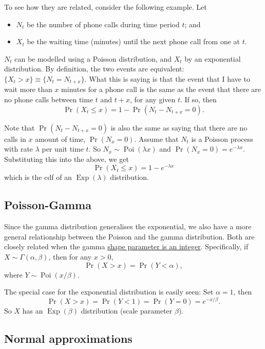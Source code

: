 \documentclass[
]{book}
\providecommand{\tightlist}{%
  \setlength{\itemsep}{0pt}\setlength{\parskip}{0pt}}
\DeclareMathOperator{\Pois}{Poi}
\DeclareMathOperator{\Exp}{Exp}
\theoremstyle{definition}
\theoremstyle{definition}
\theoremstyle{definition}
\theoremstyle{definition}
\theoremstyle{remark}
\begin{document}
To see how they are related, consider the following example.
Let

\begin{itemize}
\tightlist
\item
  \(N_t\) be the number of phone calls during time period \(t\); and
\item
  \(X_t\) be the waiting time (minutes) until the next phone call from one at \(t\).
\end{itemize}

\(N_t\) can be modelled using a Poisson distribution, and \(X_t\) by an exponential distribution.
By definition, the two events are equivalent: \(\{X_t > x \} \equiv \{N_t = N_{t+x}\}\).
What this is saying is that the event that I have to wait more than \(x\) minutes for a phone call is the same as the event that there are no phone calls between time \(t\) and \(t+x\), for any given \(t\).
If so, then \[\Pr(X_t \leq x) = 1 - \Pr(N_t - N_{t+x}=0).\]

Note that \(\Pr(N_t - N_{t+x}=0)\) is also the same as saying that there are no calls in \(x\) amount of time, \(\Pr(N_x=0)\).
Assume that \(N_t\) is a Poisson process with rate \(\lambda\) per unit time \(t\).
So \(N_x \sim \Pois(\lambda x)\) and \(\Pr(N_x=0) = e^{-\lambda x}\).
Substituting this into the above, we get
\[
  \Pr(X_t \leq x) = 1 - e^{-\lambda x}
\]
which is the cdf of an \(\Exp(\lambda)\) distribution.

\hypertarget{poisson-gamma}{%
\subsection{Poisson-Gamma}\label{poisson-gamma}}

Since the gamma distribution generalises the exponential, we also have a more general relationship between the Poisson and the gamma distribution.
Both are closely related when the gamma \uline{shape parameter is an integer}.
Specifically, if \(X\sim\Gamma(\alpha,\beta)\), then for any \(x>0\),
\[
\Pr(X>x) = \Pr(Y<\alpha),
\]
where \(Y\sim\Pois(x/\beta)\).

The special case for the exponential distribution is easily seen: Set \(\alpha=1\), then
\[
\Pr(X>x) = \Pr(Y<1) = \Pr(Y=0) = e^{-x/\beta}.
\]
So \(X\) has an \(\Exp(\beta)\) distribution (scale parameter \(\beta\)).

\hypertarget{normal-approximations}{%
\subsection{Normal approximations}\label{normal-approximations}}
\end{document}
